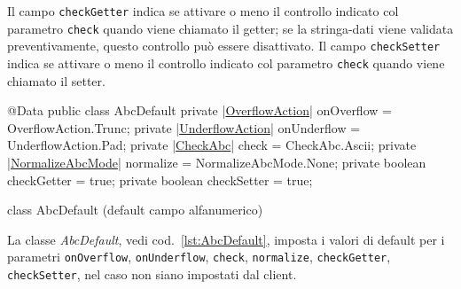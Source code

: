 \documentclass[a4paper,10pt]{report}
\newif\ifesource
\newenvironment{elisting}[1][H]
  {\captionsetup{aboveskip=0pt}\begin{listing}[#1]}
  {\end{listing}%
}
\begin{document}
Il campo \hypertarget{abc:get}{\texttt{checkGetter}} indica se attivare o meno 
il controllo indicato col parametro \verb!check! quando viene chiamato il 
getter; se la stringa-dati viene validata preventivamente, questo controllo può 
essere disattivato.
Il campo \hypertarget{abc:set}{\texttt{checkSetter}} indica se attivare o meno 
il controllo indicato col parametro \verb!check! quando viene chiamato il 
setter.

\ifesource
\begin{figure*}[!htb]
\begin{lstlisting}[language=java, 
caption=class AbcDefault (default campo alfanumerico), 
label=lst:AbcDefault]
@Data
public class AbcDefault {
    private (*\hyperref[lst:OverflowAction]{OverflowAction}*) onOverflow = OverflowAction.Trunc;
    private (*\hyperref[lst:UnderflowAction]{UnderflowAction}*) onUnderflow = UnderflowAction.Pad;
    private (*\hyperref[lst:CheckAbc]{CheckAbc}*) check = CheckAbc.Ascii;
    private (*\hyperref[lst:NormalizeAbcMode]{NormalizeAbcMode}*) normalize = NormalizeAbcMode.None;
    private boolean checkGetter = true;
    private boolean checkSetter = true;
}
\end{lstlisting}\index{AbcDefault}
\end{figure*}
\else
\begin{elisting}[!htb]
\begin{javacode}
@Data
public class AbcDefault {
    private |\hyperref[lst:OverflowAction]{OverflowAction}| onOverflow = OverflowAction.Trunc;
    private |\hyperref[lst:UnderflowAction]{UnderflowAction}| onUnderflow = UnderflowAction.Pad;
    private |\hyperref[lst:CheckAbc]{CheckAbc}| check = CheckAbc.Ascii;
    private |\hyperref[lst:NormalizeAbcMode]{NormalizeAbcMode}| normalize = NormalizeAbcMode.None;
    private boolean checkGetter = true;
    private boolean checkSetter = true;
}
\end{javacode}
\caption{class AbcDefault (default campo alfanumerico)}
\label{lst:AbcDefault}
\end{elisting}
\fi

La classe \textsl{AbcDefault}, vedi cod.~\ref{lst:AbcDefault}, imposta i valori
di default per i parametri \verb!onOverflow!, \verb!onUnderflow!, \verb!check!, 
\verb!normalize!, \verb!checkGetter!, \verb!checkSetter!, nel caso non siano 
impostati dal client.
\end{document}
